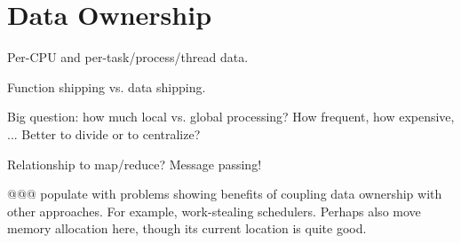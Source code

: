 
\chapter{Data Ownership}
\label{chp:Data Ownership}

Per-CPU and per-task/process/thread data.

Function shipping vs. data shipping.

Big question: how much local vs. global processing?  How frequent,
how expensive, ...  Better to divide or to centralize?

Relationship to map/reduce?  Message passing!

@@@ populate with problems showing benefits of coupling data ownership
with other approaches.
For example, work-stealing schedulers.
Perhaps also move memory allocation here, though its current location
is quite good.
